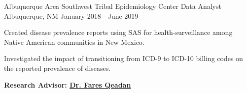 \begin{cventries}

\cventry
{Albuquerque Area Southwest Tribal Epidemiology Center} %
{Data Analyst} %
{Albuquerque, NM} %
{January 2018 - June 2019} %
{
  \begin{cvitems} %
\item Created disease prevalence reports using SAS for health-surveillance among Native American communities in New Mexico.
\item Investigated the impact of transitioning from ICD-9 to ICD-10 billing codes on the reported prevalence of diseases.
\item \textbf{Research Advisor: 
\href{http://www.mathalpha.com/FaresQeadan.html}{\underline{Dr. Fares Qeadan}}
}
  \end{cvitems}
}




\end{cventries}

